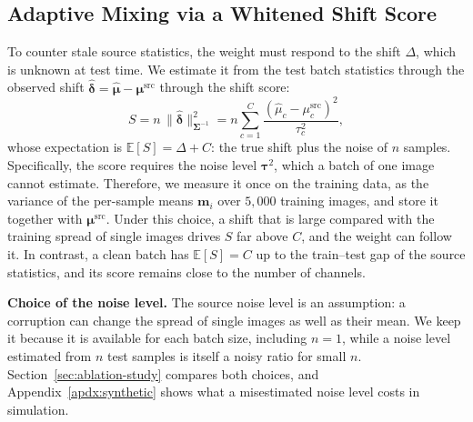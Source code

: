 \subsection{Adaptive Mixing via a Whitened Shift Score} \label{sec:shift-score}
To counter stale source statistics, the weight must respond to the shift $\Delta$, which is unknown at test time.
We estimate it from the test batch statistics through the observed shift $\hat{\boldsymbol{\delta}} = \hat{\boldsymbol{\mu}} - \boldsymbol{\mu}^{\text{src}}$ through the shift score:
\begin{equation}\label{eq:shift-score}
S = n\,\big\|\hat{\boldsymbol{\delta}}\big\|^{2}_{\boldsymbol{\Sigma}^{-1}} = n \sum_{c=1}^{C} \frac{(\hat{\mu}_c - \mu^{\text{src}}_c)^{2}}{\tau^{2}_c},
\end{equation}
whose expectation is $\mathbb{E}[S] = \Delta + C$: the true shift plus the noise of $n$ samples.
Specifically, the score requires the noise level $\boldsymbol{\tau}^2$, which a batch of one image cannot estimate.
Therefore, we measure it once on the training data, as the variance of the per-sample means $\mathbf{m}_i$ over $5{,}000$ training images, and store it together with $\boldsymbol{\mu}^{\text{src}}$.
Under this choice, a shift that is large compared with the training spread of single images drives $S$ far above $C$, and the weight can follow it.
In contrast, a clean batch has $\mathbb{E}[S] = C$ up to the train--test gap of the source statistics, and its score remains close to the number of channels.

\textbf{Choice of the noise level.} The source noise level is an assumption: a corruption can change the spread of single images as well as their mean.
We keep it because it is available for each batch size, including $n{=}1$, while a noise level estimated from $n$ test samples is itself a noisy ratio for small $n$.
Section~\ref{sec:ablation-study} compares both choices, and Appendix~\ref{apdx:synthetic} shows what a misestimated noise level costs in simulation.

